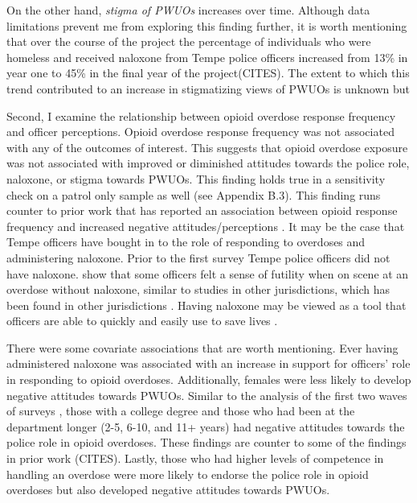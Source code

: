 On the other hand, \textit{stigma of PWUOs} increases over time. Although data limitations prevent me from exploring this finding further, it is worth mentioning that over the course of the project the percentage of individuals who were homeless and received naloxone from Tempe police officers increased from 13\% in year one to 45\% in the final year of the project(CITES). The extent to which this trend contributed to an increase in stigmatizing views of PWUOs is unknown but %

Second, I examine the relationship between opioid overdose response frequency and officer perceptions. Opioid overdose response frequency was not associated with any of the outcomes of interest. This suggests that opioid overdose exposure was not associated with improved or diminished attitudes towards the police role, naloxone, or stigma towards PWUOs. This finding holds true in a sensitivity check on a patrol only sample as well (see Appendix B.3). This finding runs counter to prior work that has reported an association between opioid response frequency and increased negative attitudes/perceptions \textcite{carroll_knowledge_2020, murphy_police_2021}. It may be the case that Tempe officers have bought in to the role of responding to overdoses and administering naloxone. Prior to the first survey Tempe police officers did not have naloxone. \textcite{white_moving_2021} show that some officers felt a sense of futility when on scene at an overdose without naloxone, similar to studies in other jurisdictions, which has been found in other jurisdictions \parencite{smiley-mcdonald_perspectives_2022}. Having naloxone may be viewed as a tool that officers are able to quickly and easily use to save lives \parencite{lloyd_its_2023}. 

There were some covariate associations that are worth mentioning. Ever having administered naloxone was associated with an increase in support for officers' role in responding to opioid overdoses. Additionally, females were less likely to develop negative attitudes towards PWUOs. Similar to the analysis of the first two waves of surveys \parencite{white_narcan_2021}, those with a college degree and those who had been at the department longer (2-5, 6-10, and 11+ years) had negative attitudes towards the police role in opioid overdoses. These findings are counter to some of the findings in prior work (CITES). Lastly, those who had higher levels of competence in handling an overdose were more likely to endorse the police role in opioid overdoses but also developed negative attitudes towards PWUOs. 

